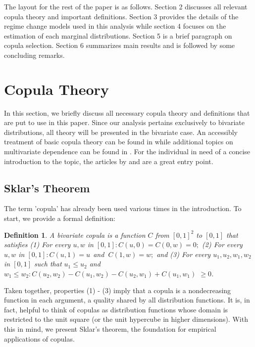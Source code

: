 \documentclass[12pt]{article}
\newtheorem{defn}{Definition}
\begin{document}
The layout for the rest of the paper is as follows. Section 2 discusses all relevant copula theory and important definitions. Section 3 provides the details of the regime change models used in this analysis while section 4 focuses on the estimation of each marginal distributions. Section 5 is a brief paragraph on copula selection. Section 6 summarizes main results and is followed by some concluding remarks.

\section{Copula Theory}

In this section, we briefly discuss all necessary copula theory and definitions that are put to use in this paper. Since our analysis pertains exclusively to bivariate distributions, all theory will be presented in the bivariate case. An accessibly treatment of basic copula theory can be found in \cite{Nelsen_2007} while additional topics on multivariate dependence can be found in \cite{Joe_1997}. For the individual in need of a concise introduction to the topic, the articles by \cite{Embrechts_et_al_2003} and \cite{Genest_and_Favre_2007} are a great entry point.

\subsection{Sklar's Theorem}

The term 'copula' has already been used various times in the introduction. To start, we provide a formal definition:

\begin{defn} \label{defn:copula}
	A bivariate copula is a function $C$ from $\left[0,1\right]^{2}$ to $\left[0,1\right]$ that satisfies (1) For every $u,w$ in $\left[0,1\right] :C\left(u,0\right) = C\left(0,w\right) = 0;$ (2) For every $u,w$ in $\left[0,1\right] :C\left(u,1\right) = u\ \ $and $\ C\left(1,w\right) = w;$ and (3) For every $u_{1}, u_{2}, w_{1}, w_{2}$ in $\left[0,1\right]$ such that $u_{1} \leq u_{2}$ and $w_{1} \leq w_{2}:C\left(u_{2}, w_{2}\right) - C\left(u_{1}, w_{2}\right) - C\left(u_{2}, w_{1}\right) + C\left(u_{1}, w_{1}\right)$ $\geq 0$.
\end{defn}

Taken together, properties (1) - (3) imply that a copula is a nondecreasing function in each argument, a quality shared by all distribution functions. It is, in fact, helpful to think of copulas as distribution functions whose domain is restricted to the unit square (or the unit hypercube in higher dimensions). With this in mind, we present Sklar's theorem, the foundation for empirical applications of copulas.
\end{document}
